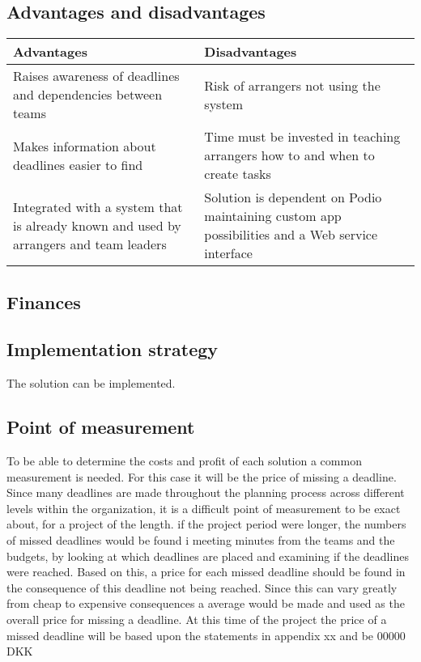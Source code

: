 \subsection{Advantages and disadvantages}
\label{sec:advantages_disadvantages}
\begin{center}
    \begin{tabular}{ | p{7cm} | p{7cm} |}
    \hline
    \textbf{Advantages} & \textbf{Disadvantages}  \\ \hline
     Raises awareness of deadlines and dependencies between teams & Risk of arrangers not using the system\\ \hline
     Makes information about deadlines easier to find & Time must be invested in teaching arrangers how to and when to create tasks\\ \hline
     Integrated with a system that is already known and used by arrangers and team leaders & Solution is dependent on Podio maintaining custom app possibilities and a Web service interface \\ \hline
    \hline
    \end{tabular}
\end{center}


\subsection{Finances}

\subsection{Implementation strategy}
The solution can be implemented.

\subsection{Point of measurement}
To be able to determine the costs and profit of each solution a common measurement is needed. For this case it will be the price of missing a deadline. Since many deadlines are made throughout the planning process across different levels within the organization, it is a difficult point of measurement to be exact about, for a project of the length. if the project period were longer, the numbers of missed deadlines would be found i meeting minutes from the teams and the budgets, by looking at which deadlines are placed and examining if the deadlines were reached. Based on this, a price for each missed deadline should be found in the consequence of this deadline not being reached. Since this can vary greatly from cheap to expensive consequences a average would be made and used as the overall price for missing a deadline. At this time of the project the price of a missed deadline will be based upon the statements in appendix xx and be 00000 DKK





